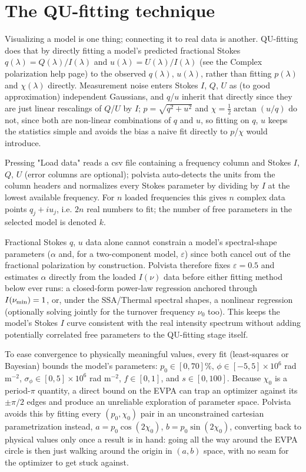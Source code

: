\section{The QU-fitting technique}
Visualizing a model is one thing; connecting it to real data is another. QU-fitting does that by directly fitting a model's predicted fractional Stokes $q(\lambda)=Q(\lambda)/I(\lambda)$ and $u(\lambda)=U(\lambda)/I(\lambda)$ (see the Complex polarization help page) to the observed $q(\lambda)$, $u(\lambda)$, rather than fitting $p(\lambda)$ and $\chi(\lambda)$ directly. Measurement noise enters Stokes $I$, $Q$, $U$ as (to good approximation) independent Gaussians, and $q$/$u$ inherit that directly since they are just linear rescalings of $Q$/$U$ by $I$; $p=\sqrt{q^2+u^2}$ and $\chi=\frac12\arctan(u/q)$ do not, since both are non-linear combinations of $q$ and $u$, so fitting on $q$, $u$ keeps the statistics simple and avoids the bias a naive fit directly to $p$/$\chi$ would introduce.

Pressing "Load data" reads a csv file containing a frequency column and Stokes $I$, $Q$, $U$ (error columns are optional); polvista auto-detects the units from the column headers and normalizes every Stokes parameter by dividing by $I$ at the lowest available frequency. For $n$ loaded frequencies this gives $n$ complex data points $q_j+iu_j$, i.e. $2n$ real numbers to fit; the number of free parameters in the selected model is denoted $k$.

Fractional Stokes $q$, $u$ data alone cannot constrain a model's spectral-shape parameters ($\alpha$ and, for a two-component model, $\varepsilon$) since both cancel out of the fractional polarization by construction. Polvista therefore fixes $\varepsilon=0.5$ and estimates $\alpha$ directly from the loaded $I(\nu)$ data before either fitting method below ever runs: a closed-form power-law regression anchored through $I(\nu_{\rm min})=1$, or, under the SSA/Thermal spectral shapes, a nonlinear regression (optionally solving jointly for the turnover frequency $\nu_0$ too). This keeps the model's Stokes $I$ curve consistent with the real intensity spectrum without adding potentially correlated free parameters to the QU-fitting stage itself.

To ease convergence to physically meaningful values, every fit (least-squares or Bayesian) bounds the model's parameters: $p_0\in[0,70]\%$, $\phi\in[-5,5]\times10^6$ rad m$^{-2}$, $\sigma_\phi\in[0,5]\times10^6$ rad m$^{-2}$, $f\in[0,1]$, and $s\in[0,100]$. Because $\chi_0$ is a period-$\pi$ quantity, a direct bound on the EVPA can trap an optimizer against its $\pm\pi/2$ edges and produce an unreliable exploration of parameter space. Polvista avoids this by fitting every $(p_0,\chi_0)$ pair in an unconstrained cartesian parametrization instead, $a=p_0\cos(2\chi_0)$, $b=p_0\sin(2\chi_0)$, converting back to physical values only once a result is in hand: going all the way around the EVPA circle is then just walking around the origin in $(a,b)$ space, with no seam for the optimizer to get stuck against.

